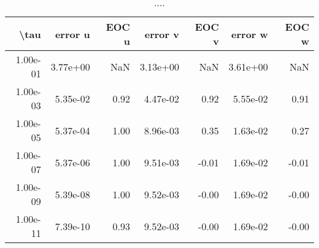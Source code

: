 \begin{table}[ht]
\centering
\begin{tabular}{rrrrrrr}
  \hline
  \textbf{\textbackslash{}tau} & \textbf{error u} & \textbf{EOC u} & \textbf{error v} & \textbf{EOC v} & \textbf{error w} & \textbf{EOC w} \\\hline
  1.00e-01 & 3.77e+00 & NaN & 3.13e+00 & NaN & 3.61e+00 & NaN \\
  1.00e-03 & 5.35e-02 & 0.92 & 4.47e-02 & 0.92 & 5.55e-02 & 0.91 \\
  1.00e-05 & 5.37e-04 & 1.00 & 8.96e-03 & 0.35 & 1.63e-02 & 0.27 \\
  1.00e-07 & 5.37e-06 & 1.00 & 9.51e-03 & -0.01 & 1.69e-02 & -0.01 \\
  1.00e-09 & 5.39e-08 & 1.00 & 9.52e-03 & -0.00 & 1.69e-02 & -0.00 \\
  1.00e-11 & 7.39e-10 & 0.93 & 9.52e-03 & -0.00 & 1.69e-02 & -0.00 \\\hline
\end{tabular}
\caption{....}
\end{table}
